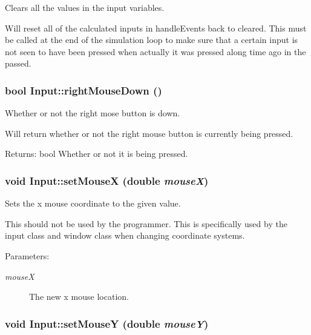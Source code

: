 Clears all the values in the input variables. 

Will reset all of the calculated inputs in handleEvents back to cleared. This must be called at the end of the simulation loop to make sure that a certain input is not seen to have been pressed when actually it was pressed along time ago in the passed. \hypertarget{class_input_60ecfa072eb3d427fa8cb1301108c2a7}{
\subsubsection[{rightMouseDown}]{\setlength{\rightskip}{0pt plus 5cm}bool Input::rightMouseDown ()}}
\label{class_input_60ecfa072eb3d427fa8cb1301108c2a7}


Whether or not the right mose button is down. 

Will return whether or not the right mouse button is currently being pressed. \begin{Desc}
\item[Returns:]bool Whether or not it is being pressed. \end{Desc}
\hypertarget{class_input_9abdbbeb53817c1b4ba8d8e1b0dde987}{
\subsubsection[{setMouseX}]{\setlength{\rightskip}{0pt plus 5cm}void Input::setMouseX (double {\em mouseX})}}
\label{class_input_9abdbbeb53817c1b4ba8d8e1b0dde987}


Sets the x mouse coordinate to the given value. 

This should not be used by the programmer. This is specifically used by the input class and window class when changing coordinate systems. \begin{Desc}
\item[Parameters:]
\begin{description}
\item[{\em mouseX}]The new x mouse location. \end{description}
\end{Desc}
\hypertarget{class_input_bc0540b1ca3477ff0418e596e0dd58d0}{
\subsubsection[{setMouseY}]{\setlength{\rightskip}{0pt plus 5cm}void Input::setMouseY (double {\em mouseY})}}
\label{class_input_bc0540b1ca3477ff0418e596e0dd58d0}


